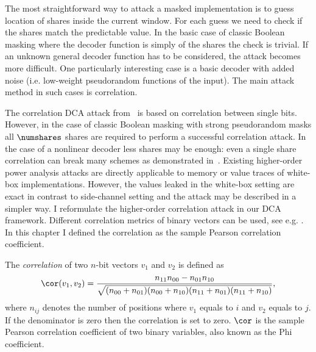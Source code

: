 
The most straightforward way to attack a masked implementation is to guess location of shares inside the current window. For each guess we need to check if the shares match the predictable value. In the basic case of classic Boolean masking where the decoder function is simply \txor{} of the shares the check is trivial. If an unknown general decoder function has to be considered, the attack becomes more difficult. One particularly interesting case is a basic \txor{} decoder with added noise (i.e. low-weight pseudorandom functions of the input). The main attack method in such cases is correlation.



The correlation DCA attack from~\cite{AttackBos} is based on correlation between single bits. However, in the case of classic Boolean masking with strong pseudorandom masks all $\numshares$ shares are required to perform a successful correlation attack. In the case of a nonlinear decoder less shares may be enough: even a single share correlation can break many schemes as demonstrated in~\cite{AttackBos,WangEncodings}. Existing higher-order power analysis attacks are directly applicable to memory or value traces of white-box implementations. However, the values leaked in the white-box setting are exact in contrast to side-channel setting and the attack may be described in a simpler way. I reformulate the higher-order correlation attack in our DCA framework. Different correlation metrics of binary vectors can be used, see e.g. \cite{warrens2008similarity}. In this chapter I defined the correlation as the sample Pearson correlation coefficient.
{
\newcommand\naa{n_{00}}
\newcommand\nab{n_{01}}
\newcommand\nba{n_{10}}
\newcommand\nbb{n_{11}}
\begin{definition}
The \emph{correlation} of two $n$-bit vectors $v_1$ and $v_2$ is defined as
$$\cor(v_1,v_2) = \frac
{\nbb\naa - \nab\nba}
{\sqrt{(\naa+\nab)(\naa+\nba)(\nbb+\nab)(\nbb+\nba)}},
$$
where $n_{ij}$ denotes the number of positions where $v_1$ equals to $i$ and $v_2$ equals to $j$. If the denominator is zero then the correlation is set to zero. $\cor$ is the sample Pearson correlation coefficient of two binary variables, also known as the Phi coefficient. 
\end{definition}
}
    

